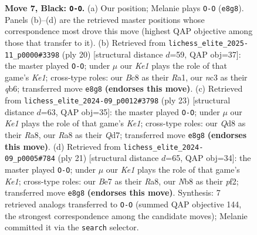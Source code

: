 \documentclass[11pt]{article}
\begin{document}
\begin{figure}[p]
\caption{\textbf{Move 7, Black: \texttt{O-O}.} (a) Our position; Melanie plays \texttt{O-O} (\texttt{e8g8}). Panels (b)--(d) are the retrieved master positions whose correspondence most drove this move (highest QAP objective among those that transfer to it). (b) Retrieved from \texttt{lichess\_elite\_2025-11\_p0000\#3398} (ply 20) [structural distance $d$=59, QAP obj=37]: the master played \texttt{O-O}; under $\mu$ our \emph{Ke1} plays the role of that game's \emph{Ke1}; cross-type roles: our \emph{B}c8 as their \emph{R}a1, our \emph{n}c3 as their \emph{q}b6; transferred move \texttt{e8g8} \textbf{(endorses this move)}. (c) Retrieved from \texttt{lichess\_elite\_2024-09\_p0012\#3798} (ply 23) [structural distance $d$=63, QAP obj=35]: the master played \texttt{O-O}; under $\mu$ our \emph{Ke1} plays the role of that game's \emph{Ke1}; cross-type roles: our \emph{Q}d8 as their \emph{R}a8, our \emph{R}a8 as their \emph{Q}d7; transferred move \texttt{e8g8} \textbf{(endorses this move)}. (d) Retrieved from \texttt{lichess\_elite\_2024-09\_p0005\#784} (ply 21) [structural distance $d$=65, QAP obj=34]: the master played \texttt{O-O}; under $\mu$ our \emph{Ke1} plays the role of that game's \emph{Ke1}; cross-type roles: our \emph{B}e7 as their \emph{R}a8, our \emph{N}b8 as their \emph{p}f2; transferred move \texttt{e8g8} \textbf{(endorses this move)}. Synthesis: 7 retrieved analogs transferred to \texttt{O-O} (summed QAP objective 144, the strongest correspondence among the candidate moves); Melanie committed it via the \texttt{search} selector.}
\label{fig:thought-m13}
\end{figure}

\clearpage
\end{document}

